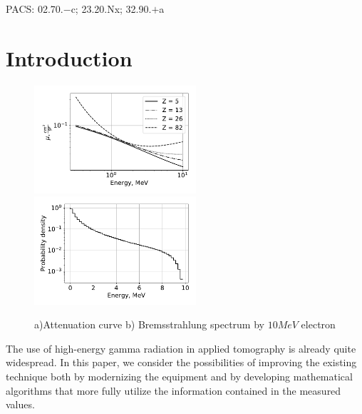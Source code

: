\documentclass[a4paper]{panl}
\begin{document}
\noindent
PACS: 02.70.$-$c; 23.20.Nx; 32.90.$+$a

\newpage
\label{sec:intro}
\section*{Introduction}
\begin{figure}[t]
    \begin{center}
        \includegraphics[width=60mm]{figures/Attenuation.pdf} 
        \includegraphics[width=60mm]{figures/Bremsstrahlung.pdf}  
        \vspace{-3mm}
        \caption{a)Attenuation curve b) Bremsstrahlung spectrum by $10 MeV$ electron}
    \end{center}
    \vspace{-5mm}
\end{figure}
The use of high-energy gamma radiation in applied tomography is already quite widespread. In this paper, we consider the possibilities of improving the existing technique both by modernizing the equipment and by developing mathematical algorithms that more fully utilize the information contained in the measured values.
\end{document}
